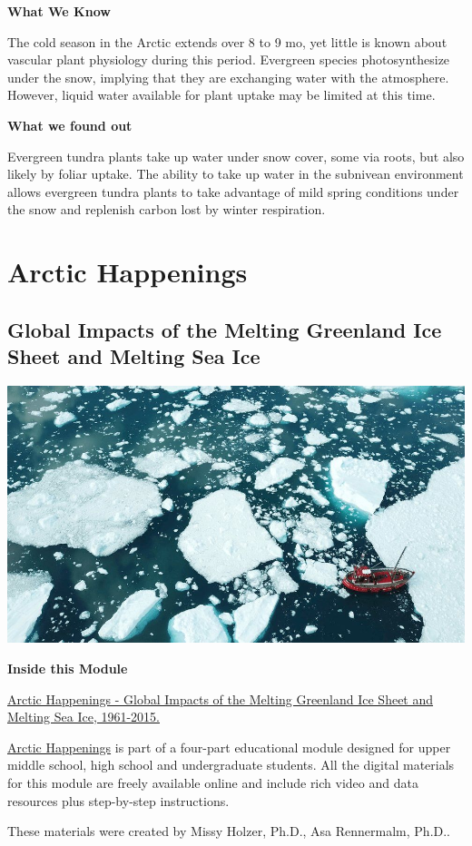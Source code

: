 \documentclass[]{book}
\begin{document}
\textbf{What We Know}

The cold season in the Arctic extends over 8 to 9 mo, yet little is known about vascular plant physiology during this period. Evergreen species photosynthesize under the snow, implying that they are exchanging water with the atmosphere. However, liquid water available for plant uptake may be limited at this time.

\textbf{What we found out}

Evergreen tundra plants take up water under snow cover, some via roots, but also likely by foliar uptake. The ability to take up water in the subnivean environment allows evergreen tundra plants to take advantage of mild spring conditions under the snow and replenish carbon lost by winter respiration.

\hypertarget{greenland}{%
\chapter*{Arctic Happenings}\label{greenland}}

\hypertarget{section-id}{%
\section*{Global Impacts of the Melting Greenland Ice Sheet and Melting Sea Ice}\label{section-id}}

\includegraphics{images/greenlandmelt.jpg}

\textbf{Inside this Module}

\href{https://arcticdata.io/catalog/view/doi\%3A10.18739\%2FA2TM7216N}{Arctic Happenings - Global Impacts of the Melting Greenland Ice Sheet and Melting Sea Ice, 1961-2015.}

\href{https://ahrl.rutgers.edu/greenland-lessons}{Arctic Happenings} is part of a four-part educational module designed for upper middle school, high school and undergraduate students. All the digital materials for this module are freely available online and include rich video and data resources plus step-by-step instructions.

These materials were created by Missy Holzer, Ph.D., Asa Rennermalm, Ph.D..


\end{document}
